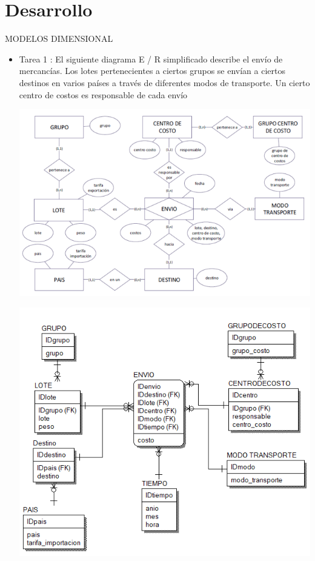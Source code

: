 \section{Desarrollo } 

MODELOS DIMENSIONAL
\begin{itemize}

\item Tarea 1 :
El siguiente diagrama E / R simplificado describe el envío de mercancías. Los lotes pertenecientes a ciertos grupos se
envían a ciertos destinos en varios países a través de diferentes modos de transporte. Un cierto centro de costos es
responsable de cada envío

\begin{center}
\includegraphics[width=14cm]{./Imagenes/tarea1.png}
\end{center}
\begin{center}
\includegraphics[width=14cm]{./Imagenes/tarea11.png}
\end{center}





\end{itemize}
